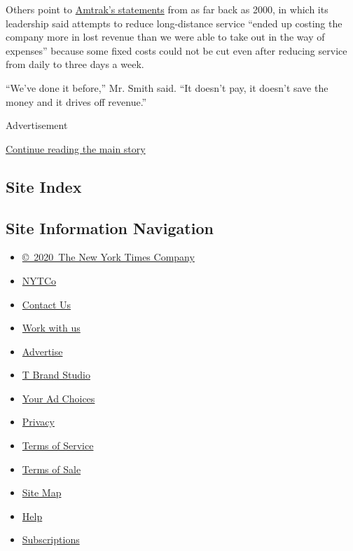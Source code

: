 Others point to
\href{https://www.govinfo.gov/content/pkg/CHRG-106shrg85968/pdf/CHRG-106shrg85968.pdf}{Amtrak's
statements} from as far back as 2000, in which its leadership said
attempts to reduce long-distance service ``ended up costing the company
more in lost revenue than we were able to take out in the way of
expenses'' because some fixed costs could not be cut even after reducing
service from daily to three days a week.

``We've done it before,'' Mr. Smith said. ``It doesn't pay, it doesn't
save the money and it drives off revenue.''

Advertisement

\protect\hyperlink{after-bottom}{Continue reading the main story}

\hypertarget{site-index}{%
\subsection{Site Index}\label{site-index}}

\hypertarget{site-information-navigation}{%
\subsection{Site Information
Navigation}\label{site-information-navigation}}

\begin{itemize}
\tightlist
\item
  \href{https://help.nytimes3xbfgragh.onion/hc/en-us/articles/115014792127-Copyright-notice}{©~2020~The
  New York Times Company}
\end{itemize}

\begin{itemize}
\tightlist
\item
  \href{https://www.nytco.com/}{NYTCo}
\item
  \href{https://help.nytimes3xbfgragh.onion/hc/en-us/articles/115015385887-Contact-Us}{Contact
  Us}
\item
  \href{https://www.nytco.com/careers/}{Work with us}
\item
  \href{https://nytmediakit.com/}{Advertise}
\item
  \href{http://www.tbrandstudio.com/}{T Brand Studio}
\item
  \href{https://www.nytimes3xbfgragh.onion/privacy/cookie-policy\#how-do-i-manage-trackers}{Your
  Ad Choices}
\item
  \href{https://www.nytimes3xbfgragh.onion/privacy}{Privacy}
\item
  \href{https://help.nytimes3xbfgragh.onion/hc/en-us/articles/115014893428-Terms-of-service}{Terms
  of Service}
\item
  \href{https://help.nytimes3xbfgragh.onion/hc/en-us/articles/115014893968-Terms-of-sale}{Terms
  of Sale}
\item
  \href{https://spiderbites.nytimes3xbfgragh.onion}{Site Map}
\item
  \href{https://help.nytimes3xbfgragh.onion/hc/en-us}{Help}
\item
  \href{https://www.nytimes3xbfgragh.onion/subscription?campaignId=37WXW}{Subscriptions}
\end{itemize}
